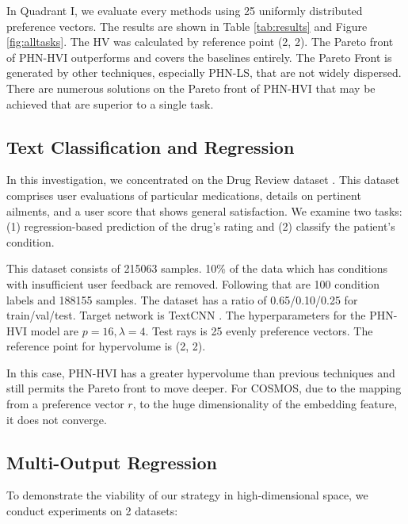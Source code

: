 \documentclass[letterpaper]{article} %
\newcommand{\ourmodel}{PHN-HVI }
\begin{document}
In Quadrant I, we evaluate every methods using 25 uniformly distributed preference vectors. The results are shown in Table \ref{tab:results} and Figure \ref{fig:alltasks}. The HV was calculated by reference point (2, 2). The Pareto front of \ourmodel outperforms and covers the baselines entirely. The Pareto Front is generated by other techniques, especially PHN-LS, that are not widely dispersed. There are numerous solutions on the Pareto front of \ourmodel that may be achieved that are superior to a single task. 

\subsection{Text Classification and Regression}


In this investigation, we concentrated on the Drug Review dataset \cite{Felix2018}. This dataset comprises user evaluations of particular medications, details on pertinent ailments, and a user score that shows general satisfaction. We examine two tasks: (1) regression-based prediction of the drug's rating and (2) classify the patient's condition. 

This dataset consists of 215063 samples. 10\% of the data which has conditions with insufficient user feedback are removed.
Following that are 100 condition labels and 188155 samples. The dataset has a ratio of 0.65/0.10/0.25 for train/val/test. Target network is TextCNN \cite{TextCNN}. The hyperparameters for the \ourmodel model are $p=16, \lambda=4$. Test rays is 25 evenly preference vectors. The reference point for hypervolume is (2, 2). 

In this case, \ourmodel has a greater hypervolume than previous techniques and still permits the Pareto front to move deeper. For COSMOS, due to the mapping from a preference vector $r$, to the huge dimensionality of the embedding feature, it does not converge.

\subsection{Multi-Output Regression}
To demonstrate the viability of our strategy in high-dimensional space, we conduct experiments on 2 datasets:
\end{document}
